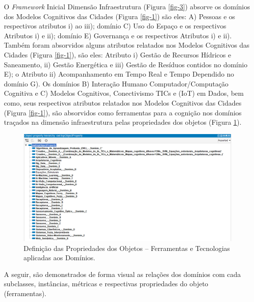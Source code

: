 \documentclass[portuguese]{textolivre}
\begin{document}
O \textit{Framework} Inicial Dimensão Infraestrutura (Figura \ref{fig-3}) absorve os domínios dos Modelos Cognitivos das Cidades (Figura \ref{fig-1}) são eles: A) Pessoas e os respectivos atributos i) ao iii); domínio C) Uso do Espaço e os respectivos Atributos i) e ii); domínio E) Governança e os respectivos Atributos i) e ii). Também foram absorvidos alguns atributos relatados nos Modelos Cognitivos das Cidades (Figura \ref{fig-1}), são eles: Atributo i) Gestão de Recursos Hídricos e Saneamento, ii) Gestão Energética e iii) Gestão de Resíduos contidos no domínio E); o Atributo ii) Acompanhamento em Tempo Real e Tempo Dependido no domínio G). Os domínios B) Interação Humano Computador/Computação Cognitiva e C) Modelos Cognitivos, Conectivismo TICs e (IoT) em Dados, bem como, seus respectivos atributos relatados nos Modelos Cognitivos das Cidades (Figura \ref{fig-1}), são absorvidos como ferramentas para a cognição nos domínios traçados na dimensão infraestrutura pelas propriedades dos objetos (Figura \ref{fig-4}).

\begin{figure}[h!]
    \centering
    \includegraphics[width=0.90\linewidth]{images/FIGURA4.png}
    \caption{Definição das Propriedades dos Objetos – Ferramentas e Tecnologias aplicadas aos Domínios.}
    \label{fig-4}
\end{figure}

A seguir, são demonstrados de forma visual as relações dos domínios com cada subclasses, instâncias, métricas e respectivas propriedades do objeto (ferramentas).
\end{document}
